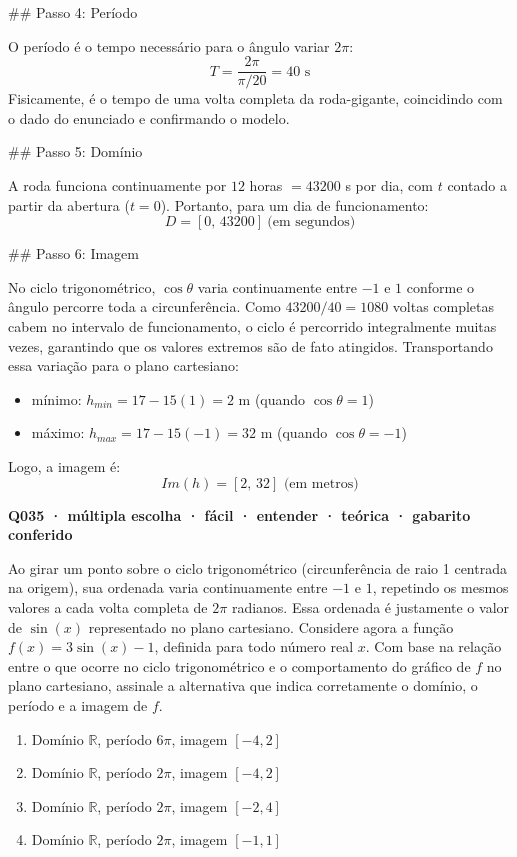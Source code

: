 \documentclass[11pt,a4paper]{article}
\begin{document}
\#\# Passo 4: Período

O período é o tempo necessário para o ângulo variar $2\pi$:
$$T=\dfrac{2\pi}{\pi/20}=40\text{ s}$$
Fisicamente, é o tempo de uma volta completa da roda-gigante, coincidindo com o dado do enunciado e confirmando o modelo.

\#\# Passo 5: Domínio

A roda funciona continuamente por $12$ horas $=43200$ s por dia, com $t$ contado a partir da abertura ($t=0$). Portanto, para um dia de funcionamento:
$$D=[0,\,43200]\ \text{(em segundos)}$$

\#\# Passo 6: Imagem

No ciclo trigonométrico, $\cos\theta$ varia continuamente entre $-1$ e $1$ conforme o ângulo percorre toda a circunferência. Como $43200/40=1080$ voltas completas cabem no intervalo de funcionamento, o ciclo é percorrido integralmente muitas vezes, garantindo que os valores extremos são de fato atingidos. Transportando essa variação para o plano cartesiano:
\begin{itemize}[nosep,leftmargin=*]
\item mínimo: $h_{min}=17-15(1)=2$ m (quando $\cos\theta=1$)
\item máximo: $h_{max}=17-15(-1)=32$ m (quando $\cos\theta=-1$)
\end{itemize}

Logo, a imagem é:
$$Im(h)=[2,\,32]\text{ (em metros)}$$

\bigskip\noindent\textbf{Q035 · múltipla escolha · fácil · entender · teórica · gabarito conferido}\par\nopagebreak
Ao girar um ponto sobre o ciclo trigonométrico (circunferência de raio 1 centrada na origem), sua ordenada varia continuamente entre $-1$ e $1$, repetindo os mesmos valores a cada volta completa de $2\pi$ radianos. Essa ordenada é justamente o valor de $\sin(x)$ representado no plano cartesiano. Considere agora a função $f(x) = 3\sin(x) - 1$, definida para todo número real $x$. Com base na relação entre o que ocorre no ciclo trigonométrico e o comportamento do gráfico de $f$ no plano cartesiano, assinale a alternativa que indica corretamente o domínio, o período e a imagem de $f$.
\begin{enumerate}[label=(\alph*)]
\item Domínio $\mathbb{R}$, período $6\pi$, imagem $[-4, 2]$
\item Domínio $\mathbb{R}$, período $2\pi$, imagem $[-4, 2]$
\item Domínio $\mathbb{R}$, período $2\pi$, imagem $[-2, 4]$
\item Domínio $\mathbb{R}$, período $2\pi$, imagem $[-1, 1]$
\end{enumerate}
\end{document}
